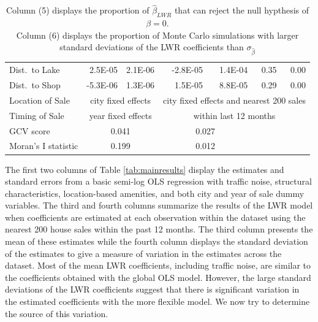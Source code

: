 \documentclass{article}\usepackage{graphicx, color}
\begin{document}
\begin{table}[bp]
{\begin{tabular}{lrrrrrr}
  Dist.\ to Lake & 2.5E-05 & 2.1E-06 & -2.8E-05 & 1.4E-04 & 0.35 & 0.00 \\ 
  Dist.\ to Shop & -5.3E-06 & 1.3E-06 & 1.5E-05 & 8.8E-05 & 0.29 & 0.00 \\  
  Location of Sale & \multicolumn{2}{c}{city fixed effects} & \multicolumn{4}{c}{\footnotesize city fixed effects and nearest 200 sales} \\
  Timing of Sale & \multicolumn{2}{c}{year fixed effects} & \multicolumn{4}{c}{within last 12 months} \\
 \hline
  GCV score & \multicolumn{2}{c}{0.041} & \multicolumn{2}{c}{0.027}  &  & \\
  Moran's I statistic & \multicolumn{2}{c}{0.199} & \multicolumn{2}{c}{0.012} & & \\
\end{tabular}
}
 \caption*{\footnotesize Column (5) displays the proportion of $\hat{\beta}_{LWR}$ that can reject the null hypthesis of $\beta =0$.\\ Column (6) displays the proportion of Monte Carlo simulations with larger standard deviations of the LWR coefficients than $\sigma_{\hat{\beta}}$}
\end{table}

The first two columns of Table \ref{tab:mainresults} display the estimates and standard errors from a basic semi-log OLS regression with traffic noise, structural characteristics, location-based amenities, and both city and year of sale dummy variables. The third and fourth columns summarize the results of the LWR model when coefficients are estimated at each observation within the dataset using the nearest 200 house sales within the past 12 months. The third column presents the mean of these estimates while the fourth column displays the standard deviation of the estimates to give a measure of variation in the estimates across the dataset. Most of the mean LWR coefficients, including traffic noise, are similar to the coefficients obtained with the global OLS model. However, the large standard deviations of the LWR coefficients suggest that there is significant variation in the estimated coefficients with the more flexible model. We now try to determine the source of this variation.
\end{document}
